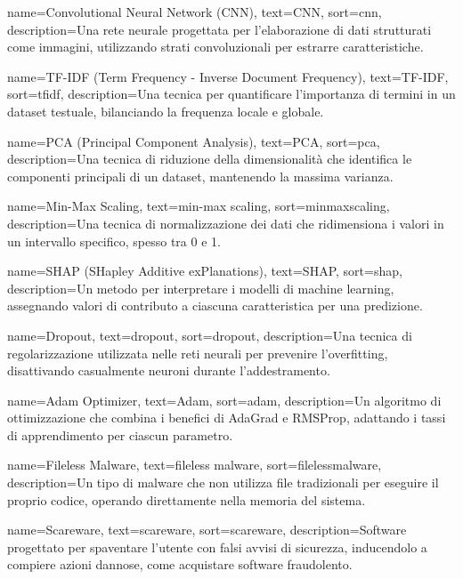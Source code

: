  {
    name={Convolutional Neural Network (CNN)},
    text={CNN},
    sort={cnn},
    description={Una rete neurale progettata per l'elaborazione di dati strutturati come immagini, utilizzando strati convoluzionali per estrarre caratteristiche.}
}

 {
    name={TF-IDF (Term Frequency - Inverse Document Frequency)},
    text={TF-IDF},
    sort={tfidf},
    description={Una tecnica per quantificare l'importanza di termini in un dataset testuale, bilanciando la frequenza locale e globale.}
}

 {
    name={PCA (Principal Component Analysis)},
    text={PCA},
    sort={pca},
    description={Una tecnica di riduzione della dimensionalità che identifica le componenti principali di un dataset, mantenendo la massima varianza.}
}

 {
    name={Min-Max Scaling},
    text={min-max scaling},
    sort={minmaxscaling},
    description={Una tecnica di normalizzazione dei dati che ridimensiona i valori in un intervallo specifico, spesso tra 0 e 1.}
}

 {
    name={SHAP (SHapley Additive exPlanations)},
    text={SHAP},
    sort={shap},
    description={Un metodo per interpretare i modelli di machine learning, assegnando valori di contributo a ciascuna caratteristica per una predizione.}
}

 {
    name={Dropout},
    text={dropout},
    sort={dropout},
    description={Una tecnica di regolarizzazione utilizzata nelle reti neurali per prevenire l'overfitting, disattivando casualmente neuroni durante l'addestramento.}
}

 {
    name={Adam Optimizer},
    text={Adam},
    sort={adam},
    description={Un algoritmo di ottimizzazione che combina i benefici di AdaGrad e RMSProp, adattando i tassi di apprendimento per ciascun parametro.}
}

 {
    name={Fileless Malware},
    text={fileless malware},
    sort={filelessmalware},
    description={Un tipo di malware che non utilizza file tradizionali per eseguire il proprio codice, operando direttamente nella memoria del sistema.}
}

 {
    name={Scareware},
    text={scareware},
    sort={scareware},
    description={Software progettato per spaventare l'utente con falsi avvisi di sicurezza, inducendolo a compiere azioni dannose, come acquistare software fraudolento.}
}

